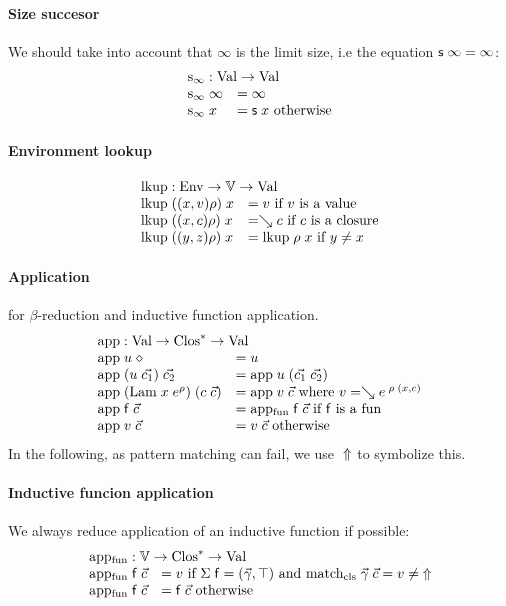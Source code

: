 \paragraph*{Size succesor}
We should take into account that $\infty$ is the limit size, i.e the equation $\mathsf{s}\; \infty = \infty$:
\[
\begin{array}[t]{ll}
\multicolumn{2}{l}{\sinfty : \Val \ra \Val}\\ 
\sinfty \; \infty & = \infty\\
\sinfty \;  x & = \s x  \mbox{ otherwise}\\ 
\end{array}
\]

\paragraph*{Environment lookup}
\[
\begin{array}{ll}
\multicolumn{2}{l}{\lkup : \Env \ra \cV \ra \Val }\\
\lkup \; ((x,v) \rho) \; x & = v \mbox{ if } v \mbox{ is a value} \\
\lkup \; ((x,c) \rho) \; x & = \wh c \mbox{ if } c \mbox{ is a closure} \\
\lkup \; ((y,z) \rho) \; x & = \lkup \; \rho \; x \mbox{ if } y \neq x  
\end{array}
\]

\paragraph*{Application}
for $\beta$-reduction and inductive function application. 
\[
\begin{array}{ll}
\multicolumn{2}{l}{\ap : \Val \ra \ves{\Clos} \ra \Val}\\
\ap \; u \; \diamond & = u \\
\ap \; (u \; \vec{c_1}) \; \vec{c_2} & = \ap \; u \; (\vec{c_1}\;\vec{c_2})\\
\ap \; (\vlam \; x \; \cl{e}{\rho}) \; (c \; \vec{c}) & = \ap \; v \; \vec{c} \mbox{ where } v = \wh \cl{e}{\ins \; \rho \; (x,c)} \\ 
\ap \; \ff \; \vec{c} & = \apf \; \ff \; \vec{c} \mbox{ if } \ff \mbox{ is a } \fun \\ 
\ap \; v \; \vec{c} & = v \; \vec{c} \mbox{ otherwise } \\
\end{array}
\]
In the following, as pattern matching can fail, we use $\;\Uparrow$ to symbolize this. 
\paragraph*{Inductive funcion application}
We always reduce application of an inductive function if possible:\[
\begin{array}{ll}
\multicolumn{2}{l}{\apf : \cV \ra \ves{\Clos} \ra \Val}\\
\apf \; \ff \; \vec{c} & = v \mbox{ if } \Sig \; \ff = (\vec{\gamma},\top) \mbox { and } \matchcls \; \vec{\gamma} \; \vec{c} = v \neq \stuck \\ 
\apf \; \ff \; \vec{c} & = \ff \; \vec{c} \mbox { otherwise } 
\end{array}
\]


